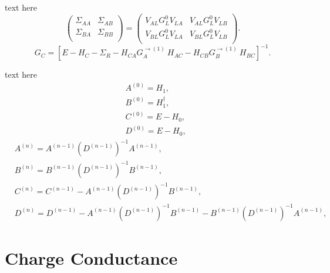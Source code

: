 \documentclass[handout,t]{beamer}
\begin{document}
\begin{frame}{text here}
	\begin{equation}
		\left( \begin{matrix}
			   {{\Sigma }_{AA}} & {{\Sigma }_{AB}}  \\
			   {{\Sigma }_{BA}} & {{\Sigma }_{BB}}  \\
			\end{matrix} \right)=\left( \begin{matrix}
			   {{V}_{AL}}G_{L}^{0}{{V}_{LA}} & {{V}_{AL}}G_{L}^{0}{{V}_{LB}}  \\
			   {{V}_{BL}}G_{L}^{0}{{V}_{LA}} & {{V}_{BL}}G_{L}^{0}{{V}_{LB}}  \\
			\end{matrix} 
		\right).
	\end{equation}
	\begin{equation}
		{{G}_{C}}={{\left[ E-{{H}_{C}}-{{\Sigma }_{R}}-{{H}_{CA}}G_{A}^{\to (1)}\ {{H}_{AC}}-{{H}_{CB}}G_{B}^{\to (1)}\ {{H}_{BC}} \right]}^{-1}}.
	\end{equation}
\end{frame}
\begin{frame}{text here}
	\begin{equation}
		\begin{aligned}
			&{{A}^{(0)}}={{H}_{1}},\\
			&{{B}^{(0)}}=H_{1}^{\dagger},\\
			&{{C}^{(0)}}=E-{{H}_{0}},\\
			&{{D}^{(0)}}=E-{{H}_{0}},
		\end{aligned}
	\end{equation}
	\begin{equation}
		\begin{aligned}
			&{{A}^{(n)}}={{A}^{(n-1)}}{{({{D}^{(n-1)}})}^{-1}}{{A}^{(n-1)}},\\
			&{{B}^{(n)}}={{B}^{(n-1)}}{{({{D}^{(n-1)}})}^{-1}}{{B}^{(n-1)}},\\
			&{{C}^{(n)}}={{C}^{(n-1)}}-{{A}^{(n-1)}}{{({{D}^{(n-1)}})}^{-1}}{{B}^{(n-1)}},\\
			&{{D}^{(n)}}={{D}^{(n-1)}}-{{A}^{(n-1)}}{{({{D}^{(n-1)}})}^{-1}}{{B}^{(n-1)}}-{{B}^{(n-1)}}{{({{D}^{(n-1)}})}^{-1}}{{A}^{(n-1)}},
		\end{aligned}
	\end{equation}
\end{frame}
\section{Charge Conductance}
			
\end{document}

